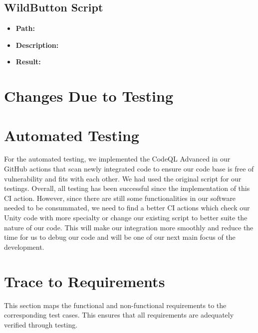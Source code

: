 \documentclass[12pt, titlepage]{article}
\begin{document}
\subsection{WildButton Script}
\begin{itemize}
    \item \textbf{Path:} 
    \item \textbf{Description:} 
    \item \textbf{Result:}
\end{itemize}


\section{Changes Due to Testing}

\section{Automated Testing}
For the automated testing, we implemented the CodeQL Advanced in our GitHub actions that scan newly integrated code to ensure our code base is free of vulnerability and fits with each other. We had used the original script for our testings. Overall, all testing has been successful since the implementation of this CI action. However, since there are still some functionalities in our software needed to be consummated, we need to find a better CI actions which check our Unity code with more specialty or change our existing script to better suite the nature of our code. This will make our integration more smoothly and reduce the time for us to debug our code and will be one of our next main focus of the development.

\section{Trace to Requirements}

This section maps the functional and non-functional requirements to the corresponding test cases. This ensures that all requirements are adequately verified through testing.
\end{document}
